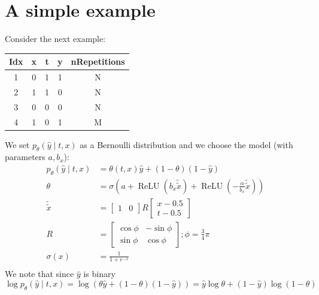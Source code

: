 \documentclass[oneside,12pt]{article}
\begin{document}
\section{A simple example}\label{sec:example}
Consider the next example:
\begin{center}
 \begin{tabular}{||c | c | c | c | c||}
 \hline
 Idx & x & t & y & nRepetitions \\ [0.5ex] 
 \hline\hline
 1 & 0 & 1 & 1 & N \\ 
 \hline
 2 & 1 & 1 & 0 & N \\
 \hline
 3 & 0 & 0 & 0 & N \\
 \hline
 4 & 1 & 0 & 1 & M \\ [1ex] 
 \hline
\end{tabular}
\end{center}
We set $p_\theta(\hat{y} \mid t,x)$ as a Bernoulli distribution and we choose the model (with parameters $a,b_x$):
\begin{equation}
    \begin{split}
        p_\theta(\hat{y} \mid t,x) &= \theta(t,x)\hat{y} + (1-\theta)(1-\hat{y})\\
        \theta &= \sigma(a+\operatorname{ReLU}(b_x\tilde{\tilde{x}}) + \operatorname{ReLU}(-\frac{\alpha}{b_x}\tilde{\tilde{x}}))\\
        \tilde{\tilde{x}} &= \begin{bmatrix} 1 & 0 \end{bmatrix} R \begin{bmatrix} x-0.5 \\ t-0.5 \end{bmatrix}\\
        R &= \begin{bmatrix} \operatorname{cos}\phi & -\operatorname{sin}\phi \\ \operatorname{sin}\phi & \operatorname{cos}\phi \end{bmatrix}; \phi = \frac{3}{4}\pi\\
        \sigma(x) &= \frac{1}{1+e^{-x}}\\
    \end{split}
\end{equation}
%
We note that since $\hat{y}$ is binary
\begin{equation}
    \operatorname{log}p_\theta(\hat{y} \mid t,x) = \operatorname{log}\left(\theta\hat{y} + (1-\theta)(1-\hat{y})\right) = \hat{y}\operatorname{log}\theta + (1-\hat{y})\operatorname{log}(1-\theta)
\end{equation}
\end{document}

